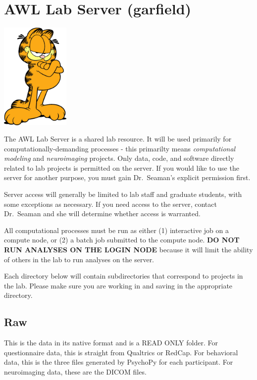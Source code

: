 \documentclass[
]{book}
\begin{document}
\hypertarget{awl-lab-server-garfield}{%
\section{AWL Lab Server (garfield)}\label{awl-lab-server-garfield}}

\includegraphics[width=0.25\textwidth,height=\textheight]{images/garfield.jpeg}

The AWL Lab Server is a shared lab resource. It will be used primarily for computationally-demanding processes - this primarilty means \emph{computational modeling} and \emph{neuroimaging} projects. Only data, code, and software directly related to lab projects is permitted on the server. If you would like to use the server for another purpose, you must gain Dr.~Seaman's explicit permission first.

Server access will generally be limited to lab staff and graduate students, with some exceptions as necessary. If you need access to the server, contact Dr.~Seaman and she will determine whether access is warranted.

All computational processes must be run as either (1) interactive job on a compute node, or (2) a batch job submitted to the compute node. \textbf{DO NOT RUN ANALYSES ON THE LOGIN NODE} because it will limit the ability of others in the lab to run analyses on the server.

Each directory below will contain subdirectories that correspond to projects in the lab. Please make sure you are working in and saving in the appropriate directory.

\hypertarget{raw}{%
\subsection{Raw}\label{raw}}

This is the data in its native format and is a READ ONLY folder. For questionnaire data, this is straight from Qualtrics or RedCap. For behavioral data, this is the three files generated by PsychoPy for each participant. For neuroimaging data, these are the DICOM files.
\end{document}

